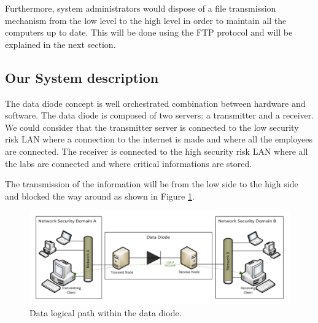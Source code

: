 \documentclass[a4paper,10pt]{article}
\begin{document}
Furthermore, system administrators would dispose of a file transmission mechanism from the low level to the high level in order to maintain all the computers up to date. This will be done using the FTP protocol and will be explained in the next section.

\subsection{Our System description}
The data diode concept is well orchestrated combination between hardware and software. The data diode is composed of two servers: a transmitter and a receiver. We could consider that the transmitter server is connected to the low security risk LAN where a connection to the internet is made and where all the employees are connected. The receiver is connected to the high security risk LAN where all the labs are connected and where critical informations are stored.

The transmission of the information will be from the low side to the high side and blocked the way around as shown in Figure \ref{fig:UDPDD}.

\begin{figure}
\centering
\includegraphics[scale=0.5]{images/logical-scheme-DD.png}
\caption{Data logical path within the data diode.}
\label{fig:UDPDD}
\end{figure}
\end{document}
